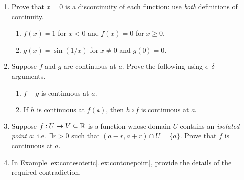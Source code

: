 \begin{exercisessec}{}{}
\begin{enumerate}
 

	\item Prove that $x=0$ is a discontinuity of each function: use \emph{both} definitions of continuity.
	\begin{enumerate}
  	\item $f(x)=1$ for $x<0$ and $f(x)=0$ for $x\ge 0$.
  	\item $g(x)=\sin(1/x)$ for $x\neq 0$ and $g(0)=0$.
	\end{enumerate}


	\item Suppose $f$ and $g$ are continuous at $a$. Prove the following using $\epsilon$--$\delta$ arguments.
	\begin{enumerate}
  	\item $f-g$ is continuous at $a$.
  	\item If $h$ is continuous at $f(a)$, then $h\circ f$ is continuous at $a$.
	\end{enumerate}
	
  

	
  
  \item Suppose $f:U\to V\subseteq\mathbb{R}$ is a function whose domain $U$ contains an \emph{isolated point} $a$: i.e.\ $\exists r>0$ such that $(a-r,a+r)\cap U=\{a\}$. Prove that $f$ is continuous at $a$.
  

	\item In Example \ref*{ex:contesoteric}.\ref{ex:contonepoint}, provide the details of the required contradiction.


\end{enumerate}
\end{exercisessec}
